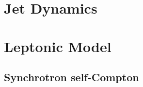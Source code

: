\documentclass[useAMS,usenatbib,a4]{mn2e}
\begin{document}


\section{Jet Dynamics}


\section{Leptonic Model}

\subsection{Synchrotron self-Compton}
\end{document}
